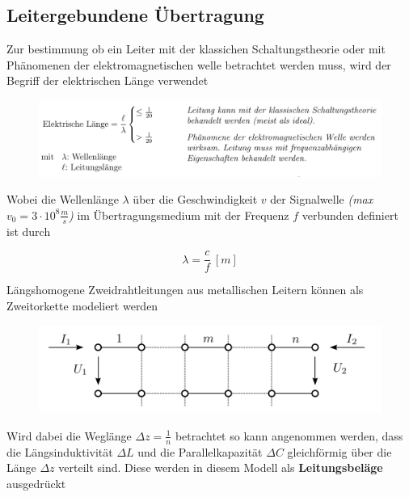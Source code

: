 \documentclass[
  10pt,
  a4paper,
  german]{article}
\numberwithin{equation}{section}
\begin{document}
\hypertarget{leitergebundene-uxfcbertragung}{%
\subsection{Leitergebundene
Übertragung}\label{leitergebundene-uxfcbertragung}}

Zur bestimmung ob ein Leiter mit der klassichen Schaltungstheorie oder
mit Phänomenen der elektromagnetischen welle betrachtet werden muss,
wird der Begriff der elektrischen Länge verwendet

\begin{figure}[H]

{\centering \includegraphics{images/03_ElektrischeLange.png}

}

\end{figure}

Wobei die Wellenlänge \(\lambda\) über die Geschwindigkeit \(v\) der
Signalwelle \emph{(max} \(v_0=3\cdot10^8\frac{m}{s}\)\emph{)} im
Übertragungsmedium mit der Frequenz \(f\) verbunden definiert ist durch

\[
\lambda=\frac{c}{f}\ [m]
\]

Längshomogene Zweidrahtleitungen aus metallischen Leitern können als
Zweitorkette modeliert werden

\begin{figure}[H]

{\centering \includegraphics[width=14cm,height=\textheight]{images/03_Zweitorkette.png}

}

\end{figure}

Wird dabei die Weglänge \(\Delta z=\frac{1}{n}\) betrachtet so kann
angenommen werden, dass die Längsinduktivität \(\Delta L\) und die
Parallelkapazität \(\Delta C\) gleichförmig über die Länge \(\Delta z\)
verteilt sind. Diese werden in diesem Modell als \textbf{Leitungsbeläge}
ausgedrückt
\end{document}
